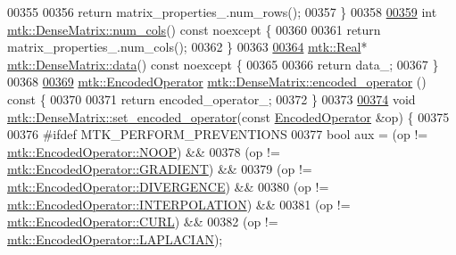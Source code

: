 \begin{DoxyCode}
00355 
00356   \textcolor{keywordflow}{return} matrix\_properties\_.num\_rows();
00357 \}
00358 
\hypertarget{mtk__dense__matrix_8cc_source_l00359}{}\hyperlink{classmtk_1_1DenseMatrix_a41747502d468c6728a4be31501b16e0e}{00359} \textcolor{keywordtype}{int} \hyperlink{classmtk_1_1DenseMatrix_a41747502d468c6728a4be31501b16e0e}{mtk::DenseMatrix::num\_cols}() const noexcept \{
00360 
00361   \textcolor{keywordflow}{return} matrix\_properties\_.num\_cols();
00362 \}
00363 
\hypertarget{mtk__dense__matrix_8cc_source_l00364}{}\hyperlink{classmtk_1_1DenseMatrix_a0c33b8a9e01d157c61ddbdf807c25d84}{00364} \hyperlink{group__c01-roots_gac080bbbf5cbb5502c9f00405f894857d}{mtk::Real}* \hyperlink{classmtk_1_1DenseMatrix_a0c33b8a9e01d157c61ddbdf807c25d84}{mtk::DenseMatrix::data}() const noexcept \{
00365 
00366   \textcolor{keywordflow}{return} data\_;
00367 \}
00368 
\hypertarget{mtk__dense__matrix_8cc_source_l00369}{}\hyperlink{classmtk_1_1DenseMatrix_ab4ba807bef5282875d2136c456794f11}{00369} \hyperlink{group__c02-enums_ga9b50023bfb2692219d2915feade94f80}{mtk::EncodedOperator} \hyperlink{classmtk_1_1DenseMatrix_ab4ba807bef5282875d2136c456794f11}{mtk::DenseMatrix::encoded\_operator}
      ()\textcolor{keyword}{ const }\{
00370 
00371   \textcolor{keywordflow}{return} encoded\_operator\_;
00372 \}
00373 
\hypertarget{mtk__dense__matrix_8cc_source_l00374}{}\hyperlink{classmtk_1_1DenseMatrix_ac0f824b0fec88c4fb42e77b7550fb0d3}{00374} \textcolor{keywordtype}{void} \hyperlink{classmtk_1_1DenseMatrix_ac0f824b0fec88c4fb42e77b7550fb0d3}{mtk::DenseMatrix::set\_encoded\_operator}(\textcolor{keyword}{const} 
      \hyperlink{group__c02-enums_ga9b50023bfb2692219d2915feade94f80}{EncodedOperator} &op) \{
00375 
00376 \textcolor{preprocessor}{  #ifdef MTK\_PERFORM\_PREVENTIONS}
00377   \textcolor{keywordtype}{bool} aux = (op != \hyperlink{namespacemtk_ga9b50023bfb2692219d2915feade94f80a722d122e81cbbe543bd5520bb8678c0e}{mtk::EncodedOperator::NOOP}) &&
00378     (op != \hyperlink{namespacemtk_ga9b50023bfb2692219d2915feade94f80a90f70ea2675c36bd9b0b44a79f37a41f}{mtk::EncodedOperator::GRADIENT}) &&
00379     (op != \hyperlink{namespacemtk_ga9b50023bfb2692219d2915feade94f80a4e4e9e6d004c642e33d6f823b57bd60e}{mtk::EncodedOperator::DIVERGENCE}) &&
00380     (op != \hyperlink{namespacemtk_ga9b50023bfb2692219d2915feade94f80a6a9b19b26cdeae14c1102cd40345d568}{mtk::EncodedOperator::INTERPOLATION}) &&
00381     (op != \hyperlink{namespacemtk_ga9b50023bfb2692219d2915feade94f80aa8bc924d0898064a538c557848f7ab48}{mtk::EncodedOperator::CURL}) &&
00382     (op != \hyperlink{namespacemtk_ga9b50023bfb2692219d2915feade94f80a1c2d5f3f8e6cbb0c7b033c388c905d22}{mtk::EncodedOperator::LAPLACIAN});

\end{DoxyCode}
